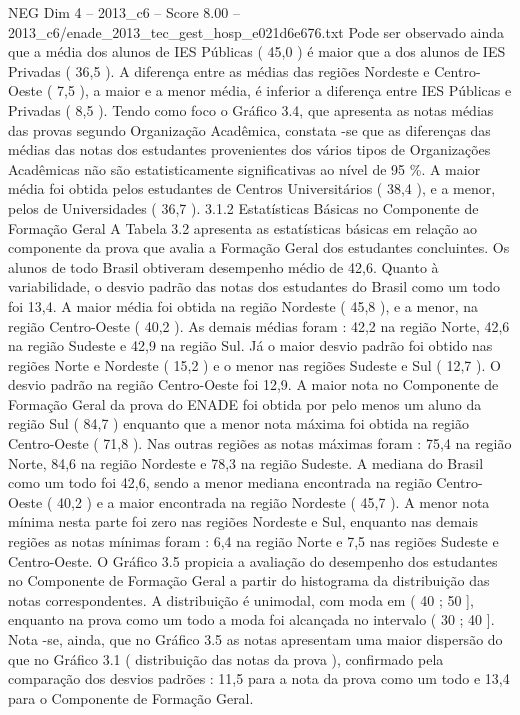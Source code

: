 \begin{textsample}{NEG Dim 4 – 2013\_c6 – Score 8.00 – 2013\_c6/enade\_2013\_tec\_gest\_hosp\_e021d6e676.txt}
Pode ser observado ainda que a média dos alunos de IES Públicas ( 45,0 ) é maior que a dos alunos de IES Privadas ( 36,5 ).
A diferença entre as médias das regiões Nordeste e Centro-Oeste ( 7,5 ), a maior e a menor média, é inferior a diferença entre IES Públicas e Privadas ( 8,5 ).
Tendo como foco o Gráfico 3.4, que apresenta as notas médias das provas segundo Organização Acadêmica, constata -se que as diferenças das médias das notas dos estudantes provenientes dos vários tipos de Organizações Acadêmicas não são estatisticamente significativas ao nível de 95 \%.
A maior média foi obtida pelos estudantes de Centros Universitários ( 38,4 ), e a menor, pelos de Universidades ( 36,7 ). 3.1.2 Estatísticas Básicas no Componente de Formação Geral A Tabela 3.2 apresenta as estatísticas básicas em relação ao componente da prova que avalia a Formação Geral dos estudantes concluintes.
Os alunos de todo Brasil obtiveram desempenho médio de 42,6.
Quanto à variabilidade, o desvio padrão das notas dos estudantes do Brasil como um todo foi 13,4.
A maior média foi obtida na região Nordeste ( 45,8 ), e a menor, na região Centro-Oeste ( 40,2 ).
As demais médias foram : 42,2 na região Norte, 42,6 na região Sudeste e 42,9 na região Sul.
Já o maior desvio padrão foi obtido nas regiões Norte e Nordeste ( 15,2 ) e o menor nas regiões Sudeste e Sul ( 12,7 ).
O desvio padrão na região Centro-Oeste foi 12,9.
A maior nota no Componente de Formação Geral da prova do ENADE foi obtida por pelo menos um aluno da região Sul ( 84,7 ) enquanto que a menor nota máxima foi obtida na região Centro-Oeste ( 71,8 ).
Nas outras regiões as notas máximas foram : 75,4 na região Norte, 84,6 na região Nordeste e 78,3 na região Sudeste.
A mediana do Brasil como um todo foi 42,6, sendo a menor mediana encontrada na região Centro-Oeste ( 40,2 ) e a maior encontrada na região Nordeste ( 45,7 ).
A menor nota mínima nesta parte foi zero nas regiões Nordeste e Sul, enquanto nas demais regiões as notas mínimas foram : 6,4 na região Norte e 7,5 nas regiões Sudeste e Centro-Oeste.
O Gráfico 3.5 propicia a avaliação do desempenho dos estudantes no Componente de Formação Geral a partir do histograma da distribuição das notas correspondentes.
A distribuição é unimodal, com moda em ( 40 ; 50 ], enquanto na prova como um todo a moda foi alcançada no intervalo ( 30 ; 40 ].
Nota -se, ainda, que no Gráfico 3.5 as notas apresentam uma maior dispersão do que no Gráfico 3.1 ( distribuição das notas da prova ), confirmado pela comparação dos desvios padrões : 11,5 para a nota da prova como um todo e 13,4 para o Componente de Formação Geral.

\end{textsample}
